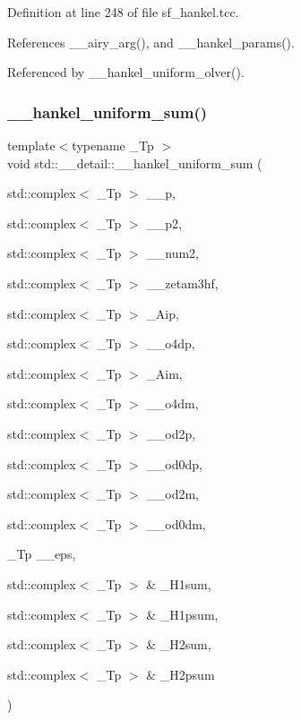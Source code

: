 Definition at line 248 of file sf\+\_\+hankel.\+tcc.



References \+\_\+\+\_\+airy\+\_\+arg(), and \+\_\+\+\_\+hankel\+\_\+params().



Referenced by \+\_\+\+\_\+hankel\+\_\+uniform\+\_\+olver().

\mbox{\label{namespacestd_1_1____detail_a561dc02bc44b2dba376d6047289563c7}} 
\subsubsection{\texorpdfstring{\+\_\+\+\_\+hankel\+\_\+uniform\+\_\+sum()}{\_\_hankel\_uniform\_sum()}}
{\footnotesize\ttfamily template$<$typename \+\_\+\+Tp $>$ \\
void std\+::\+\_\+\+\_\+detail\+::\+\_\+\+\_\+hankel\+\_\+uniform\+\_\+sum (\begin{DoxyParamCaption}\item[{std\+::complex$<$ \+\_\+\+Tp $>$}]{\+\_\+\+\_\+p,  }\item[{std\+::complex$<$ \+\_\+\+Tp $>$}]{\+\_\+\+\_\+p2,  }\item[{std\+::complex$<$ \+\_\+\+Tp $>$}]{\+\_\+\+\_\+num2,  }\item[{std\+::complex$<$ \+\_\+\+Tp $>$}]{\+\_\+\+\_\+zetam3hf,  }\item[{std\+::complex$<$ \+\_\+\+Tp $>$}]{\+\_\+\+Aip,  }\item[{std\+::complex$<$ \+\_\+\+Tp $>$}]{\+\_\+\+\_\+o4dp,  }\item[{std\+::complex$<$ \+\_\+\+Tp $>$}]{\+\_\+\+Aim,  }\item[{std\+::complex$<$ \+\_\+\+Tp $>$}]{\+\_\+\+\_\+o4dm,  }\item[{std\+::complex$<$ \+\_\+\+Tp $>$}]{\+\_\+\+\_\+od2p,  }\item[{std\+::complex$<$ \+\_\+\+Tp $>$}]{\+\_\+\+\_\+od0dp,  }\item[{std\+::complex$<$ \+\_\+\+Tp $>$}]{\+\_\+\+\_\+od2m,  }\item[{std\+::complex$<$ \+\_\+\+Tp $>$}]{\+\_\+\+\_\+od0dm,  }\item[{\+\_\+\+Tp}]{\+\_\+\+\_\+eps,  }\item[{std\+::complex$<$ \+\_\+\+Tp $>$ \&}]{\+\_\+\+H1sum,  }\item[{std\+::complex$<$ \+\_\+\+Tp $>$ \&}]{\+\_\+\+H1psum,  }\item[{std\+::complex$<$ \+\_\+\+Tp $>$ \&}]{\+\_\+\+H2sum,  }\item[{std\+::complex$<$ \+\_\+\+Tp $>$ \&}]{\+\_\+\+H2psum }\end{DoxyParamCaption})}



